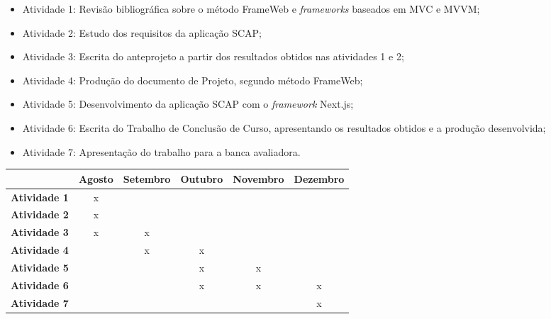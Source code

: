 \begin{itemize}
\item Atividade 1: Revisão bibliográfica sobre o método FrameWeb e \textit{frameworks} baseados em MVC e MVVM;
\item Atividade 2: Estudo dos requisitos da aplicação SCAP;
\item Atividade 3: Escrita do anteprojeto a partir dos resultados obtidos nas atividades 1 e 2;
\item Atividade 4: Produção do documento de Projeto, segundo método FrameWeb;
\item Atividade 5: Desenvolvimento da aplicação SCAP com o \textit{framework} Next.js;
\item Atividade 6: Escrita do Trabalho de Conclusão de Curso, apresentando os resultados obtidos e a produção desenvolvida;
\item Atividade 7: Apresentação do trabalho para a banca avaliadora.
\end{itemize}

\begin{table}[h]
\centering
\begin{tabular}{c|c|c|c|c|c|}
\cline{2-6}
\multicolumn{1}{l|}{} & \textbf{Agosto} & \textbf{Setembro} & \textbf{Outubro} & \textbf{Novembro} & \textbf{Dezembro} \\ \hline
\multicolumn{1}{|c|}{\textbf{Atividade 1}} & x &   &   &   &   \\ \hline
\multicolumn{1}{|c|}{\textbf{Atividade 2}} & x &   &   &   &   \\ \hline
\multicolumn{1}{|c|}{\textbf{Atividade 3}} & x & x &   &   &   \\ \hline
\multicolumn{1}{|c|}{\textbf{Atividade 4}} &   & x & x &   &   \\ \hline
\multicolumn{1}{|c|}{\textbf{Atividade 5}} &   &   & x & x &   \\ \hline
\multicolumn{1}{|c|}{\textbf{Atividade 6}} &   &   & x & x & x \\ \hline
\multicolumn{1}{|c|}{\textbf{Atividade 7}} &   &   &   &   & x \\ \hline
\end{tabular}
\end{table}
